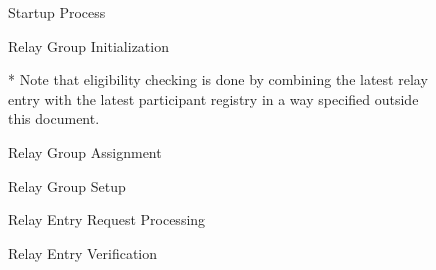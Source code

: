 \documentclass{article}
\begin{document}
\usetikzlibrary{positioning}
\usetikzlibrary{arrows.meta}
\usetikzlibrary{shapes.symbols}
\usetikzlibrary{calc}


\begin{figure}
  
  \label{fig:startup}

  \caption{Startup Process}
\end{figure}

\begin{figure}
  
  
  \caption{\label{fig:relay-group-initialization}Relay Group Initialization}
\end{figure}

\begin{figure}
  
  
  \caption{\label{fig:relay-group-assignment}Relay Group Assignment}

  \vspace{0.5cm}
  * Note that eligibility checking is done by combining the latest relay entry
  with the latest participant registry in a way specified outside this document.
\end{figure}

\begin{figure}
  
  
  \caption{\label{fig:relay-group-setup}Relay Group Setup}
\end{figure}

\begin{figure}
  
   
  \caption{\label{fig:relay-entry-request-processing}Relay Entry Request Processing}
\end{figure}

\begin{figure}
  

  \caption{\label{fig:relay-entry-verification}Relay Entry Verification}
\end{figure}
\end{document}
